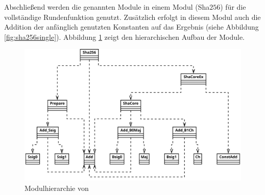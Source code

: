 Abschließend werden die genannten Module in einem Modul (Sha$256$) für die vollständige Rundenfunktion genutzt. Zusätzlich erfolgt in
diesem Modul auch die Addition der anfänglich genutzten Konstanten auf das Ergebnis (siehe Abbildung \ref{fig:sha256single}).
Abbildung \ref{fig:sha256_module} zeigt den hierarchischen Aufbau der Module.
\begin{figure}[!h]
  \centering
  \includegraphics[scale=0.265]{images/module}
  \caption{Modulhierarchie von }
  \label{fig:sha256_module}
\end{figure}